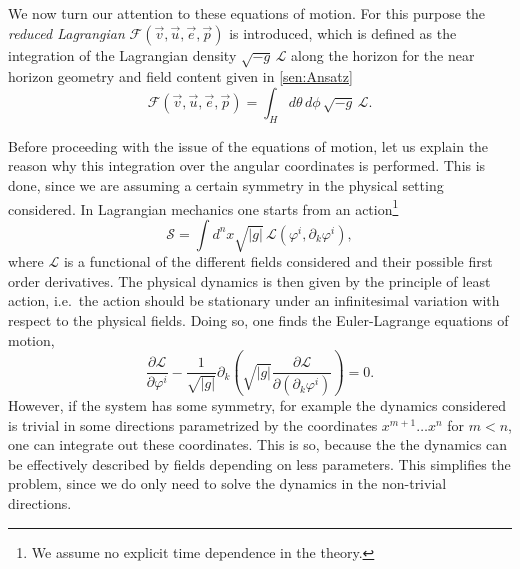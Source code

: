 \documentclass[12pt,twoside]{book}
\begin{document}
We now turn our attention to these equations of motion. For this purpose the \emph{reduced Lagrangian} $\mathcal{F}(\vec{v},\vec{u},\vec{e},\vec{p})$ is introduced, which is defined as the integration of the Lagrangian density $\sqrt{-g}\,\mathcal{L}$ along the horizon for the near horizon geometry and field content given in \eqref{sen:Ansatz} \cite{Sen:2005kx}
\begin{equation}\label{sen:reducedLag-def}
\mathcal{F}(\vec{v},\vec{u},\vec{e},\vec{p}) = \int_{H} d\theta \, d\phi \, \sqrt{-g}\,\mathcal{L}.
\end{equation}

Before proceeding with the issue of the equations of motion, let us explain the reason why this integration over the angular coordinates is performed. This is done, since we are assuming a certain symmetry in the physical setting considered. In Lagrangian mechanics one starts from an action\footnote{We assume no explicit time dependence in the theory.}
\begin{equation}
\mathcal{S} = \int d^{n}x \sqrt{|g|} \, \mathcal{L}(\varphi^{i}, \partial_{k} \varphi^{i}),
\end{equation}
where $\mathcal{L}$ is a functional of the different fields considered and their possible first order derivatives. The physical dynamics is then given by the principle of least action, i.e.\ the action should be stationary under an infinitesimal variation with respect to the physical fields. Doing so, one finds the Euler-Lagrange equations of motion,
\begin{equation}
\frac{\partial \mathcal{L}}{\partial \varphi^{i}} - \frac{1}{\sqrt{|g|}} \partial_{k} \left( \sqrt{|g|} \frac{\partial \mathcal{L}}{\partial ( \partial_{k} \varphi^{i})} \right) = 0.
\end{equation}
However, if the system has some symmetry, for example the dynamics considered is trivial in some directions parametrized by the coordinates $x^{m+1} \ldots x^{n}$ for $m < n$, one can integrate out these coordinates. This is so, because the the dynamics can be effectively described by fields depending on less parameters. This simplifies the problem, since we do only need to solve the dynamics in the non-trivial directions.
\end{document}
